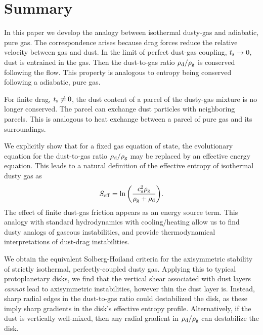 \section{Summary}\label{summary}
In this paper we develop the analogy between isothermal 
dusty-gas and adiabatic, pure gas. The correspondence arises
because drag forces reduce the relative velocity between gas and
dust. In the limit of perfect dust-gas coupling, $t_\mathrm{s} \to 0$,  
 dust is entrained in 
the gas. Then the dust-to-gas ratio $\rho_\mathrm{d}/\rho_\mathrm{g}$ is conserved
following the flow. This property is analogous to entropy being conserved
following a adiabatic, pure gas. 

For finite drag, $t_\mathrm{s}\neq 0$, the dust content of a 
parcel of the dusty-gas mixture is no longer conserved. The parcel 
can exchange dust particles with neighboring parcels. %
This is analogous to heat exchange between a parcel of pure gas and
its surroundings.    

We explicitly show that for a fixed gas equation of state, the  
evolutionary equation for the dust-to-gas ratio $\rho_\mathrm{d}/\rho_\mathrm{g}$ may be replaced by an 
effective energy equation. This leads to a 
natural definition of the effective entropy of isothermal dusty gas as  
\begin{align*}
  S_\mathrm{eff}  = \ln{\left(\frac{c_s^2\rho_\mathrm{g}}{\rho_\mathrm{g}+\rho_\mathrm{d}}\right)}.  
\end{align*}
The effect of finite dust-gas friction appears as an energy
source term.  This analogy with standard 
hydrodynamics with cooling/heating allow us to find dusty analogs of gaseous
instabilities, and provide thermodynamical interpretations of  
dust-drag instabilities. 


We obtain the equivalent Solberg-Hoiland criteria for the 
axisymmetric stability of strictly isothermal, perfectly-coupled dusty gas.  
Applying this to typical protoplanetary disks, we find that 
the vertical shear associated with dust 
 layers \emph{cannot} lead to axisymmetric  
  instabilities, however thin the dust layer is.    
Instead, sharp radial  edges in the dust-to-gas ratio could destabilized the
disk, as these imply sharp gradients in the disk's effective entropy
profile. Alternatively, if the dust is vertically well-mixed, then any
radial gradient in $\rho_\mathrm{d}/\rho_\mathrm{g}$ can destabilize the disk. 




